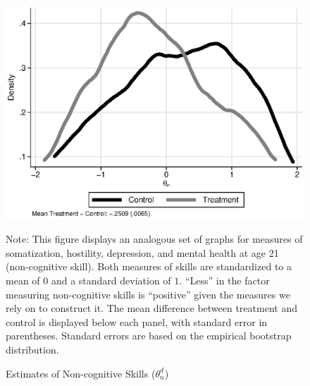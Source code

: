 \documentclass[static]{JJH-Beamer}
\begin{document}
\begin{frame}
 \addtocounter{framenumber}{-1}

\begin{figure}[H]
\caption{Estimates of Non-cognitive Skills ($\theta_{n}^d$)}\label{fig:c}
\begin{center}
\includegraphics[width=.65\textwidth]{output/abccare_nfactor.eps}
\end{center}
\tiny \flushleft Note: This figure displays an analogous set of graphs for measures of somatization, hostility, depression, and mental health at age 21 (non-cognitive skill). Both measures of skills are standardized to a mean of $0$ and a standard deviation of $1$. ``Less'' in the factor measuring non-cognitive skills is ``positive'' given the measures we rely on to construct it. The mean difference between treatment and control is displayed below each panel, with standard error in parentheses. Standard errors are based on the empirical bootstrap distribution.\\
\end{figure}

\end{frame}
\end{document}
